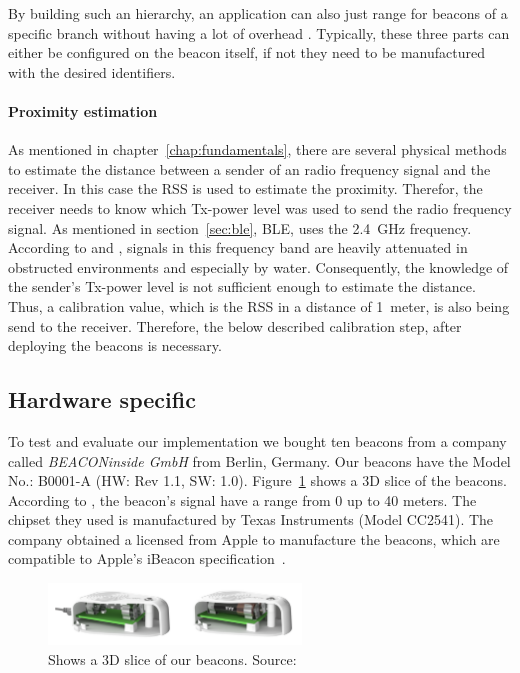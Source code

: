 By building such an hierarchy, an application can also just range for beacons of a specific branch without having a lot of overhead \citep{apple:getting_started,binside:ds}. Typically, these three parts can either be configured on the beacon itself, if not they need to be manufactured with the desired identifiers.

\paragraph{Proximity estimation} As mentioned in chapter~\ref{chap:fundamentals}, there are several physical methods to estimate the distance between a sender of an radio frequency signal and the receiver. In this case the \acl{RSS} is used to estimate the proximity. Therefor, the receiver needs to know which Tx-power level was used to send the radio frequency signal. As mentioned in section~\ref{sec:ble}, \ac{BLE}, uses the 2.4~GHz frequency. According to \citet{apple:getting_started} and \citet{binside:ds}, signals in this frequency band are heavily attenuated in obstructed environments and especially by water. Consequently, the knowledge of the sender's Tx-power level is not sufficient enough to estimate the distance. Thus, a calibration value, which is the \acl{RSS} in a distance of 1~meter, is also being send to the receiver. Therefore, the below described calibration step, after deploying the beacons is necessary.

\subsection{Hardware specific} To test and evaluate our implementation we bought ten beacons from a company called \emph{BEACONinside GmbH} from Berlin, Germany. Our beacons have the Model No.: B0001-A (HW: Rev 1.1, SW: 1.0). Figure~\ref{fig:bi:beacons} shows a 3D slice of the beacons. According to \citet{binside:ds}, the beacon's signal have a range from 0 up to 40 meters. The chipset they used is manufactured by Texas Instruments (Model CC2541). The company obtained a licensed from Apple to manufacture the beacons, which are compatible to Apple's iBeacon specification~\citep{binside:ds}.

\begin{figure}
\includegraphics[width=0.6\textwidth]{figures/BEACONinside_beacons}
\caption{Shows a 3D slice of our beacons. Source:~\citep{binside:ds}}
\label{fig:bi:beacons}
\end{figure}

